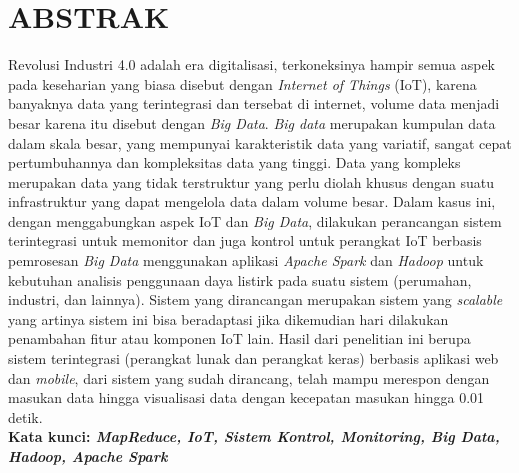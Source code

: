 \documentclass[12pt,a4paper]{report}
\begin{document}
\chapter*{\centering ABSTRAK}
\thispagestyle{myplain}
\begin{spacing}{1.0}
\noindent Revolusi Industri 4.0 adalah era digitalisasi, terkoneksinya hampir semua aspek pada keseharian yang biasa disebut dengan \textit{Internet of Things} (IoT), karena banyaknya data yang terintegrasi dan tersebat di internet, volume data menjadi besar karena itu disebut dengan \textit{Big Data}. \textit{Big data} merupakan kumpulan data dalam skala besar, yang mempunyai karakteristik data yang variatif, sangat cepat pertumbuhannya dan kompleksitas data yang tinggi. Data yang kompleks merupakan data yang tidak terstruktur yang perlu diolah khusus dengan suatu infrastruktur yang dapat mengelola data dalam volume
besar. Dalam kasus ini, dengan menggabungkan aspek IoT dan \textit{Big Data}, dilakukan perancangan sistem terintegrasi untuk memonitor dan juga kontrol untuk perangkat IoT berbasis pemrosesan \textit{Big Data} menggunakan aplikasi \textit{Apache Spark} dan \textit{Hadoop} untuk kebutuhan analisis penggunaan daya listirk pada suatu sistem (perumahan, industri, dan lainnya). Sistem yang dirancangan merupakan sistem yang \textit{scalable} yang artinya sistem ini bisa beradaptasi jika dikemudian hari dilakukan penambahan fitur atau komponen IoT lain. Hasil dari penelitian ini berupa sistem terintegrasi (perangkat lunak dan perangkat keras) berbasis aplikasi web dan \textit{mobile}, dari sistem yang sudah dirancang, telah mampu merespon dengan masukan data hingga visualisasi data dengan kecepatan masukan hingga 0.01 detik.\\
\textbf{Kata kunci: \textit{MapReduce, IoT, Sistem Kontrol, Monitoring, Big Data, Hadoop, Apache Spark}}
\end{spacing}
\end{document}
